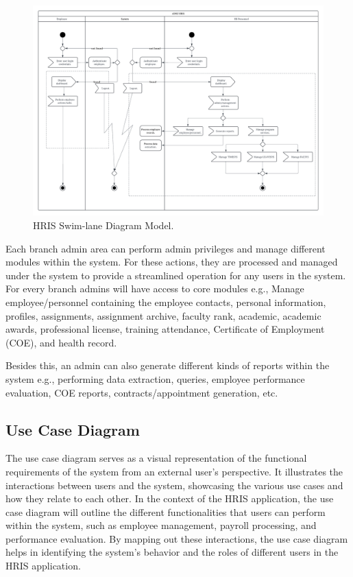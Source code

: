     \begin{figure}[H]
        \centering
        \includegraphics[width=1\linewidth]{figures/images/swimlane.png}
        \caption{HRIS Swim-lane Diagram Model.}
        \label{fig:swimlane}
    \end{figure}

    Each branch admin area can perform admin privileges and manage different modules within the system. For these actions, they are processed and managed under the system to provide a streamlined operation for any users in the system. For every branch admins will have access to core modules e.g., Manage employee/personnel containing the employee contacts, personal information, profiles, assignments, assignment archive, faculty rank, academic, academic awards, professional license, training attendance, Certificate of Employment (COE), and health record.

    Besides this, an admin can also generate different kinds of reports within the system e.g., performing data extraction, queries, employee performance evaluation, COE reports, contracts/appointment generation, etc.

    \subsection{Use Case Diagram}
    
    The use case diagram serves as a visual representation of the functional requirements of the system from an external user's perspective. It illustrates the interactions between users and the system, showcasing the various use cases and how they relate to each other. In the context of the HRIS application, the use case diagram will outline the different functionalities that users can perform within the system, such as employee management, payroll processing, and performance evaluation. By mapping out these interactions, the use case diagram helps in identifying the system's behavior and the roles of different users in the HRIS application.


